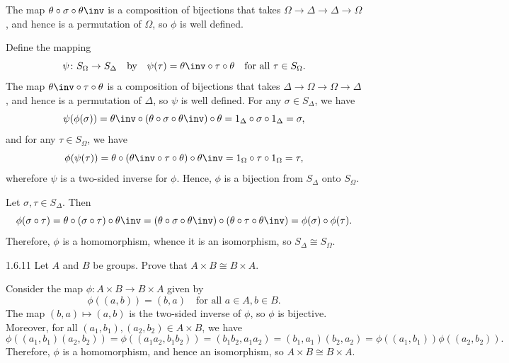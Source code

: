 \begin{solenum}
    \item The map $\theta \circ \sigma \circ \theta\inv$ is a composition of bijections that takes $\Omega \to \Delta \to \Delta \to \Omega$, and hence is a permutation of $\Omega$, so $\phi$ is well defined.
    \item Define the mapping 
    \[
    	\psi \colon S_\Omega \to S_\Delta\quad \text{by} \quad \psi(\tau) = \theta\inv \circ \tau \circ \theta \quad \text{for all } \tau \in S_\Omega.
    \]
    The map $\theta\inv \circ \tau \circ \theta$ is a composition of bijections that takes $\Delta \to \Omega \to \Omega \to \Delta$, and hence is a permutation of $\Delta$, so $\psi$ is well defined.
	For any $\sigma \in S_\Delta$, we have
    \[
    	\psi(\phi(\sigma)) = \theta\inv \circ (\theta \circ \sigma \circ \theta\inv) \circ \theta = 1_\Delta \circ \sigma \circ 1_\Delta = \sigma,
    \]
    and for any $\tau \in S_\Omega$, we have
    \[
    	\phi(\psi(\tau)) = \theta \circ (\theta\inv \circ \tau \circ \theta) \circ \theta\inv = 1_\Omega \circ \tau \circ 1_\Omega = \tau,
    \]
    wherefore $\psi$ is a two-sided inverse for $\phi$.
	Hence, $\phi$ is a bijection from $S_\Delta$ onto $S_\Omega$.
    \item Let $\sigma, \tau \in S_\Delta$.
	Then
    \[
    	\phi(\sigma \circ \tau) = \theta \circ (\sigma \circ \tau) \circ \theta\inv = (\theta \circ \sigma \circ \theta\inv) \circ (\theta \circ \tau \circ \theta\inv) = \phi(\sigma) \circ \phi(\tau).
    \]
    Therefore, $\phi$ is a homomorphism, whence it is an isomorphism, so $S_\Delta \cong S_\Omega$.
\end{solenum}

\begin{exercise}{1.6.11}
    Let $A$ and $B$ be groups.
	Prove that $A \times B \cong B \times A$.
\end{exercise}

\begin{sol}
    Consider the map $\phi \colon A \times B \to B \times A$ given by
    \[
    	\phi((a, b)) = (b, a) \quad \text{for all } a \in A, b \in B.
    \]
    The map $(b, a) \mapsto (a, b)$ is the two-sided inverse of $\phi$, so $\phi$ is bijective.
	Moreover, for all $(a_1, b_1), (a_2, b_2) \in A \times B$, we have
    \[
    	\phi((a_1, b_1)(a_2, b_2)) = \phi((a_1a_2, b_1b_2)) = (b_1b_2, a_1a_2) = (b_1, a_1)(b_2, a_2) = \phi((a_1, b_1))\phi((a_2, b_2)).
    \]
    Therefore, $\phi$ is a homomorphism, and hence an isomorphism, so $A \times B \cong B \times A$.
\end{sol}

